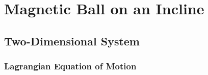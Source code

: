 \chapter{Magnetic Ball on an Incline}
\label{chap:incline}
\vspace*{-0.9cm}


\section{Two-Dimensional System}
\label{sec:twodim}
\subsection*{Lagrangian Equation of Motion}


